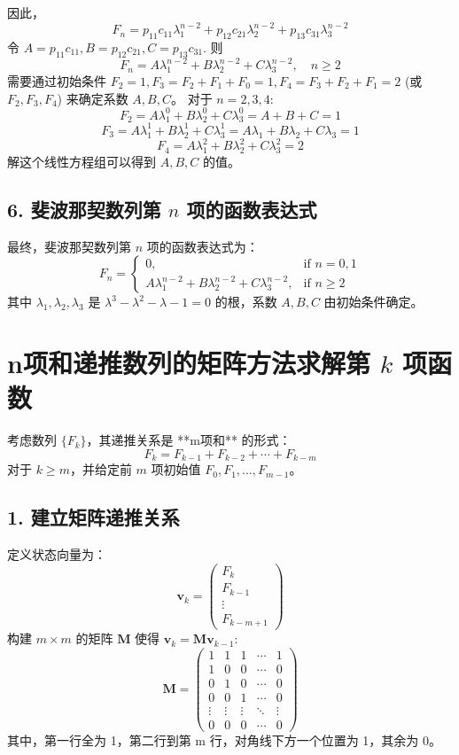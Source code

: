 \documentclass{article}
\begin{document}
因此，
$$ F_n = p_{11} c_{11} \lambda_1^{n-2} + p_{12} c_{21} \lambda_2^{n-2} + p_{13} c_{31} \lambda_3^{n-2} $$
令 $A = p_{11} c_{11}, B = p_{12} c_{21}, C = p_{13} c_{31}$. 则
$$ F_n = A \lambda_1^{n-2} + B \lambda_2^{n-2} + C \lambda_3^{n-2}, \quad n \ge 2 $$
需要通过初始条件 $F_2=1, F_3=F_2+F_1+F_0=1, F_4=F_3+F_2+F_1=2$ (或 $F_2, F_3, F_4$) 来确定系数 $A, B, C$。
对于 $n=2, 3, 4$:
$$ F_2 = A \lambda_1^{0} + B \lambda_2^{0} + C \lambda_3^{0} = A + B + C = 1 $$
$$ F_3 = A \lambda_1^{1} + B \lambda_2^{1} + C \lambda_3^{1} = A \lambda_1 + B \lambda_2 + C \lambda_3 = 1 $$
$$ F_4 = A \lambda_1^{2} + B \lambda_2^{2} + C \lambda_3^{2} = 2 $$
解这个线性方程组可以得到 $A, B, C$ 的值。

\subsection*{6. 斐波那契数列第 $n$ 项的函数表达式}

最终，斐波那契数列第 $n$ 项的函数表达式为：
$$ F_n = \begin{cases} 0, & \text{if } n = 0, 1 \\ A \lambda_1^{n-2} + B \lambda_2^{n-2} + C \lambda_3^{n-2}, & \text{if } n \ge 2 \end{cases} $$
其中 $\lambda_1, \lambda_2, \lambda_3$ 是 $\lambda^3 - \lambda^2 - \lambda - 1 = 0$ 的根，系数 $A, B, C$ 由初始条件确定。

\section*{n项和递推数列的矩阵方法求解第 $k$ 项函数}

考虑数列 $\{F_k\}$，其递推关系是 **m项和** 的形式：
$$ F_k = F_{k-1} + F_{k-2} + \cdots + F_{k-m} $$
对于 $k \ge m$，并给定前 $m$ 项初始值 $F_0, F_1, \ldots, F_{m-1}$。

\subsection*{1. 建立矩阵递推关系}

定义状态向量为：
$$ \mathbf{v}_k = \begin{pmatrix} F_k \\ F_{k-1} \\ \vdots \\ F_{k-m+1} \end{pmatrix} $$
构建 $m \times m$ 的矩阵 $\mathbf{M}$ 使得 $\mathbf{v}_k = \mathbf{M} \mathbf{v}_{k-1}$:
$$ \mathbf{M} = \begin{pmatrix}
1 & 1 & 1 & \cdots & 1 \\
1 & 0 & 0 & \cdots & 0 \\
0 & 1 & 0 & \cdots & 0 \\
0 & 0 & 1 & \cdots & 0 \\
\vdots & \vdots & \vdots & \ddots & \vdots \\
0 & 0 & 0 & \cdots & 0
\end{pmatrix} $$
其中，第一行全为 1，第二行到第 m 行，对角线下方一个位置为 1，其余为 0。
\end{document}
